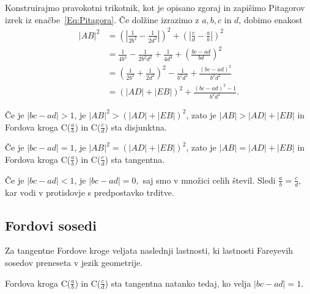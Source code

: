 \documentclass[mat1]{fmfdelo}
\begin{document}
\begin{dokaz}
Konstruirajmo pravokotni trikotnik, kot je opisano zgoraj in zapišimo Pitagorov izrek iz enačbe~\eqref{Eq:Pitagora}.
Če dolžine izrazimo z $a, b, c$ in $d$, dobimo enakost
%
\begin{align}
|AB|^2 
  &= \left ( \left| \frac{1}{2b^2} - \frac{1}{2d^2} \right| \right)^2  + \left ( \left| \frac{c}{d} - \frac{a}{b} \right| \right )^2 \nonumber \\ 
  &= \frac{1}{4b^4} - \frac{1}{2b^2d^2} + \frac{1}{4d^4} + \left (\frac{bc-ad}{bd} \right )^2 \nonumber \\
  &= \left (\frac{1}{2b^2} + \frac{1}{2d^2} \right )^2 - \frac{1}{b^2d^2} + \frac{(bc-ad)^2}{b^2d^2} \nonumber \\
  &= (|AD| + |EB|)^2 + \frac{(bc-ad)^2-1}{b^2d^2}.
\end{align}

Če je $|bc-ad|>1$, je $|AB|^2 > (|AD| + |EB|)^2$, zato je $|AB| > |AD| + |EB|$ in Fordova kroga C($\frac{a}{b}$) in C($\frac{c}{d}$) sta disjunktna.

Če je $|bc-ad|=1$, je $|AB|^2 = (|AD| + |EB|)^2$, zato je $|AB| = |AD| + |EB|$ in Fordova kroga C($\frac{a}{b}$) in C($\frac{c}{d}$) sta tangentna.

Če je $|bc-ad|<1$, je $|bc-ad|=0,$ saj smo v množici celih števil. Sledi $\frac{a}{b} = \frac{c}{d},$ kar vodi v protislovje s predpostavko trditve.
\end{dokaz}

\subsection{Fordovi sosedi}
%
Za tangentne Fordove kroge veljata naslednji lastnosti, ki lastnosti Fareyevih sosedov preneseta v jezik geometrije.

\begin{trditev}
\label{trd:FordTangentnost}
Fordova kroga C($\frac{a}{b}$) in C($\frac{c}{d}$) sta tangentna natanko tedaj, ko velja \( |bc-ad|=1. \)
\end{trditev}
\end{document}
